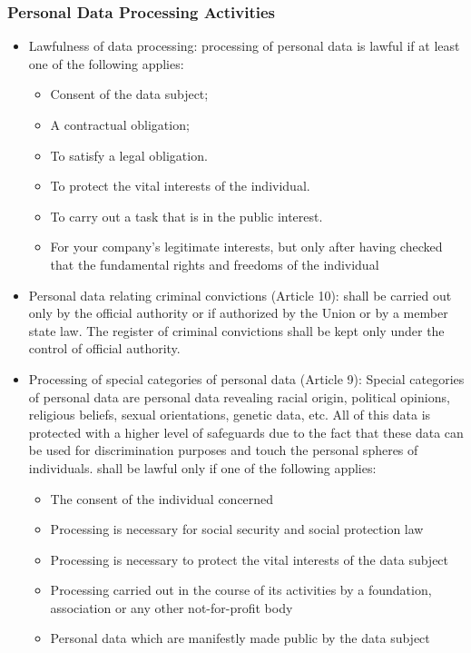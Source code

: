 \subsubsection{Personal Data Processing Activities}
\begin{itemize}
    \item Lawfulness of data processing: processing of personal data is lawful if at least one of the following applies:
    \begin{itemize}
        \item Consent of the data subject;
        \item A contractual obligation;
        \item To satisfy a legal obligation.
        \item To protect the vital interests of the individual.
        \item To carry out a task that is in the public interest.
        \item For your company’s legitimate interests, but only after having checked that the fundamental rights and freedoms of the individual
    \end{itemize}
    \item Personal data relating criminal convictions (Article 10): shall be carried out only by the official authority or if authorized by the Union or by a member state law. The register of criminal convictions shall be kept only under the control of official authority.
    \item Processing of special categories of personal data (Article 9): 
    Special categories of personal data are personal data revealing racial origin, political opinions, religious beliefs, sexual orientations, genetic data, etc. All of this data is protected with a higher level of safeguards due to the fact that these data can be used for discrimination purposes and touch the personal spheres of individuals. 
    shall be lawful only if one of the following applies:
    \begin{itemize}
        \item The consent of the individual concerned
        \item Processing is necessary for social security and social protection law
        \item Processing is necessary to protect the vital interests of the data subject
        \item Processing carried out in the course of its activities by a foundation, association or any other not-for-profit body
        \item Personal data which are manifestly made public by the data subject

\end{itemize}
\end{itemize}
